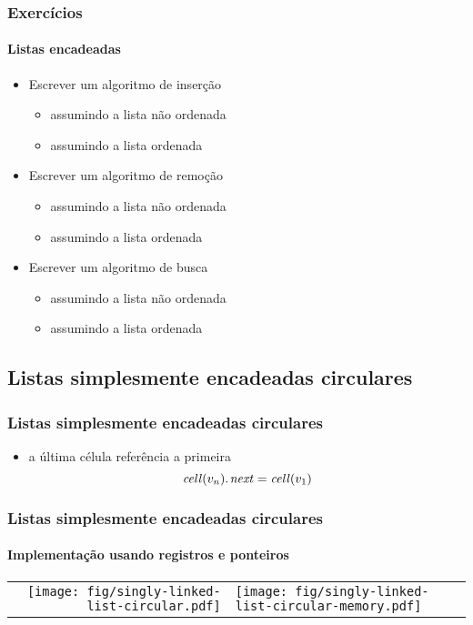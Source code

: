 \documentclass{beamer}
\begin{document}
\begin{frame}

  \frametitle{Exercícios}
  \framesubtitle{Listas encadeadas}

  \begin{itemize}
    \item Escrever um algoritmo de inserção
      \begin{itemize}
        \item assumindo a lista não ordenada
        \item assumindo a lista ordenada
      \end{itemize}
    \item Escrever um algoritmo de remoção
      \begin{itemize}
        \item assumindo a lista não ordenada
        \item assumindo a lista ordenada
      \end{itemize}
    \item Escrever um algoritmo de busca
      \begin{itemize}
        \item assumindo a lista não ordenada
        \item assumindo a lista ordenada
      \end{itemize}
  \end{itemize}

\end{frame}

\subsection{Listas simplesmente encadeadas circulares}

\begin{frame}

  \frametitle{Listas simplesmente encadeadas circulares}

  \begin{itemize}

    \item a última célula referência a primeira
      $$
      \attrib{\id{cell}(v_n)}{next} = \id{cell}(v_1)
      $$
  \end{itemize}

\end{frame}

\begin{frame}
  \frametitle{Listas simplesmente encadeadas circulares}
  \framesubtitle{Implementação usando registros e ponteiros}

  \begin{center}
    \begin{tabular}{rl}
    \texttt{[image: fig/singly-linked-list-circular.pdf]}
    &
    \texttt{[image: fig/singly-linked-list-circular-memory.pdf]}
    \end{tabular}
  \end{center}

\end{frame}
\end{document}
